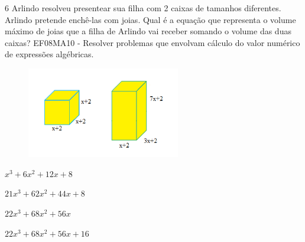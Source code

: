










\num{6} Arlindo resolveu presentear sua filha com 2 caixas de tamanhos
diferentes. Arlindo pretende enchê-las com joias. Qual é a equação que
representa o volume máximo de joias que a filha de Arlindo vai receber
somando o volume das duas caixas? EF08MA10 - Resolver problemas que
envolvam cálculo do valor numérico de expressões algébricas.

\begin{figure}[H]
\centering\includegraphics[width=2.63333in,height=1.56545in]{./imgSAEB_8_MAT/media/image55.png}
\end{figure}

\begin{escolha}
\item $x^3 + 6x^2 + 12x + 8$
\item $21x^3 + 62x^2 + 44x + 8$
\item $22x^3 + 68x^2+ 56x$
\item $22x^3 + 68x^2 + 56x + 16$
\end{escolha}



